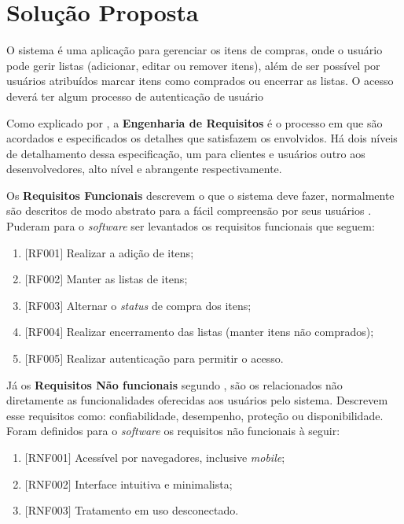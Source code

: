 \documentclass[12pt]{article}
\begin{document}
\section{Solução Proposta}

O sistema é uma aplicação para gerenciar os itens de compras, onde o usuário pode gerir listas (adicionar, editar ou remover itens), além de ser possível por usuários atribuídos marcar itens como comprados ou encerrar as listas. O acesso deverá ter algum processo de autenticação de usuário

Como explicado por \cite{sommerville2011}, a \textbf{Engenharia de Requisitos} é o processo em que são acordados e especificados os detalhes que satisfazem os envolvidos. Há dois níveis de detalhamento dessa especificação, um para clientes e usuários outro aos desenvolvedores, alto nível e abrangente respectivamente.

Os \textbf{Requisitos Funcionais} descrevem o que o sistema deve fazer, normalmente são descritos de modo abstrato para a fácil compreensão por seus usuários \cite{sommerville2011}. Puderam para o \textit{software} ser levantados os requisitos funcionais que seguem:
\begin{enumerate}
\item $[$RF001$]$ Realizar a adição de itens;
\item $[$RF002$]$ Manter as listas de itens;
\item $[$RF003$]$ Alternar o \textit{status} de compra dos itens;
\item $[$RF004$]$ Realizar encerramento das listas (manter itens não comprados);
\item $[$RF005$]$ Realizar autenticação para permitir o acesso.
\end{enumerate}

Já os \textbf{Requisitos Não funcionais} segundo \cite{sommerville2011}, são os relacionados não diretamente as funcionalidades oferecidas aos usuários pelo sistema. Descrevem esse requisitos como: confiabilidade, desempenho, proteção ou disponibilidade.
Foram definidos para o \textit{software}  os requisitos não funcionais à seguir:
\begin{enumerate}
\item $[$RNF001$]$ Acessível por navegadores, inclusive \textit{mobile};
\item $[$RNF002$]$ Interface intuitiva e minimalista;
\item $[$RNF003$]$ Tratamento em uso desconectado.
\end{enumerate}
\end{document}
